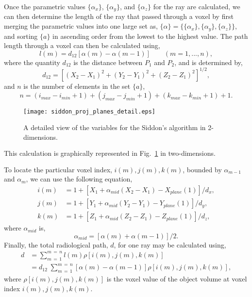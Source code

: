 Once the parametric values $\{\alpha_x\}$, $\{\alpha_y\}$, and $\{\alpha_z\}$ for the ray are calculated, we can then determine the length of the ray that passed through a voxel by first merging the parametric values into one large set as, $\{ \alpha \}  = \{ \{\alpha_x\}, \{\alpha_y\}, \{\alpha_z\} \}$, and sorting $\{ a \}$ in ascending order from the lowest to the highest value.  The path length through a voxel can then be calculated using, 
%
\begin{equation}
l(m) = d_{12} \left[ \alpha(m) - \alpha(m-1) \right] \qquad (m = 1, ..., n),
\label{eq:siddon_length}
\end{equation}
%
where the quantity $d_{12}$ is the distance between $P_1$ and $P_2$, and is determined by,
%
\begin{equation}
d_{12} = \left[ (X_2 - X_1)^2 + (Y_2 - Y_1)^2 + (Z_2 - Z_1)^2 \right]^{1/2}, 
\label{eq:siddon_d12}
\end{equation}
%
and $n$ is the number of elements in the set $\{ a \}$,
%
\begin{equation}
n = (i_{max} - i_{min} + 1) + (j_{max} - j_{min}+1) + (k_{max}-k_{min}+1) + 1.
\label{eq:siddon_n}
\end{equation}
%
\begin{figure}[ht]
\centering
\texttt{[image: siddon\_proj\_planes\_detail.eps]}
\caption{A detailed view of the variables for the Siddon's algorithm in 2-dimensions.}
\label{fig:siddon_plane_detail}
\end{figure}
%
This calculation is graphically represented in Fig.~\ref{fig:siddon_plane_detail} in two-dimensions.

To locate the particular voxel index, $i(m), j(m), k(m)$, bounded by $\alpha_{m-1}$ and $\alpha_m$, we can use the following equation,
\begin{equation}
\begin{aligned}
i(m) &= 1 + \left[ X_1 + \alpha_{mid}(X_2 - X_1) - X_{plane}(1) \right] /d_x, \\
j(m) &= 1 + \left[ Y_1 + \alpha_{mid}(Y_2 - Y_1) - Y_{plane}(1) \right] /d_y, \\
k(m) &= 1 + \left[ Z_1 + \alpha_{mid}(Z_2 - Z_1) - Z_{plane}(1) \right] /d_z,
\end{aligned}
\label{eq:siddon_voxel}
\end{equation}
where $\alpha_{mid}$ is,
\begin{equation}
\alpha_{mid} = \left[ \alpha(m) + \alpha(m-1) \right] /2.
\label{eq:siddon_alphamid}
\end{equation}
%
Finally, the total radiological path, $d$, for one ray may be calculated using,
%
\begin{equation}
\begin{aligned}
d &= \sum\limits_{m \, = \, 1}^{m \, = \, n} l(m) \rho\left[ i(m), j(m), k(m) \right] \\
  &= d_{12} \; \sum\limits_{m \, = \, 1}^{m \, = \, n} \left[ \alpha(m) - \alpha(m-1) \right] \rho \left[ i(m), j(m), k(m) \right],
\end{aligned}
\label{eq:siddon_path}
\end{equation}
%
where $\rho \left[ i(m), j(m), k(m) \right]$ is the voxel value of the object volume at voxel index $i(m), j(m), k(m)$.


